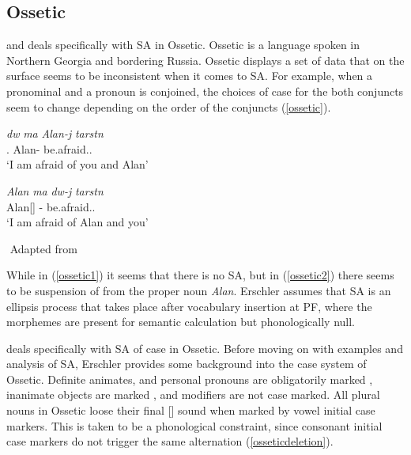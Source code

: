 \subsection{Ossetic}

\cite{erschler2012suspended} and \cite{erschler2018suspended} deals specifically with SA in Ossetic. Ossetic is a language spoken in Northern Georgia and bordering Russia. Ossetic displays a set of data that on the surface seems to be inconsistent when it comes to SA. For example, when a pronominal and a pronoun is conjoined, the choices of case for the both conjuncts seem to change depending on the order of the conjuncts (\ref{ossetic}).

\begin{exe}
    \ex \label{ossetic}
    \begin{xlist}
        \ex \label{ossetic1}
        \gll 
        \textit{d\textturna w} \textit{\textturna ma} \textit{Alan-\textturna j} \textit{tarst\textturna n} \\
        {\Second}{\Sg}.{\Obl} {\And} Alan-{\Abl} be.afraid.{\Pst}.{\First}{\Sg} \\
        \glt `I am afraid of you and Alan'
        
        \ex \label{ossetic2}
        \gll 
        \textit{Alan} \textit{\textturna ma} \textit{d\textturna w-\textturna j} \textit{tarst\textturna n} \\
        Alan[{\Nom}] {\And} {\Second}{\Sg}-{\Abl} be.afraid.{\Pst}.{\First}{\Sg} \\
        \glt `I am afraid of Alan and you'
    \end{xlist}
    ${}$ \hfill Adapted from \cite{erschler2012suspended}
\end{exe}

While in (\ref{ossetic1}) it seems that there is no SA, but in (\ref{ossetic2}) there seems to be suspension of {\Abl} from the proper noun \textit{Alan}. Erschler assumes that SA is an ellipsis process that takes place after vocabulary insertion at PF, where the morphemes are present for semantic calculation but phonologically null. 

\cite{erschler2012suspended} deals specifically with SA of case in Ossetic. Before moving on with examples and analysis of SA, Erschler provides some background into the case system of Ossetic. Definite animates, and personal pronouns are obligatorily marked {\Obl}, inanimate objects are marked {\Nom}, and modifiers are not case marked. All plural nouns in Ossetic loose their final [\textturna] sound when marked by vowel initial case markers. This is taken to be a phonological constraint, since consonant initial case markers do not trigger the same alternation (\ref{osseticdeletion}).

